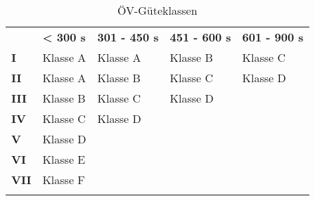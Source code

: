 \begin{longtable}[c]{l p{3.3cm} p{3.3cm} p{3.3cm} p{3.3cm}}
    \midrule
    \textbf{}
                            & \textbf{< 300 s}
                            & \textbf{301 - 450 s}
                            & \textbf{451 - 600 s}
                            & \textbf{601 - 900 s}\\
    \textbf{I}
                            & Klasse A
                            & Klasse A
                            & Klasse B
                            & Klasse C\\
    \textbf{II}
                            & Klasse A
                            & Klasse B
                            & Klasse C
                            & Klasse D\\
    \textbf{III}
                            & Klasse B
                            & Klasse C
                            & Klasse D
                            &\\
    \textbf{IV}
                            & Klasse C
                            & Klasse D
                            &
                            &\\
    \textbf{V}
                            & Klasse D
                            &
                            &
                            &\\
    \textbf{VI}
                            & Klasse E
                            &
                            &
                            &\\
    \textbf{VII}
                            & Klasse F
                            &
                            &
                            &\\                                
    \bottomrule
\caption{ÖV-Güteklassen}
\label{table:ÖV-Güteklassen}
\end{longtable}
